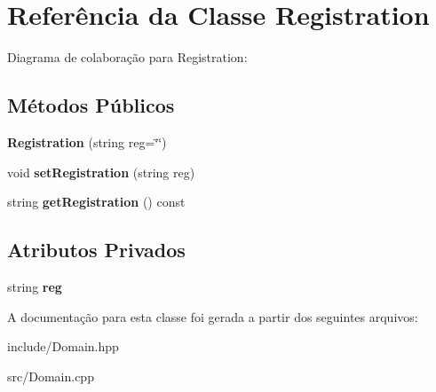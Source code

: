 \hypertarget{classRegistration}{}\section{Referência da Classe Registration}
\label{classRegistration}


Diagrama de colaboração para Registration\+:
\subsection*{Métodos Públicos}
\begin{DoxyCompactItemize}
\item 
{\bfseries Registration} (string reg=\char`\"{}\char`\"{})\hypertarget{classRegistration_adaf7a6aa993b11cde0b298c976ae5913}{}\label{classRegistration_adaf7a6aa993b11cde0b298c976ae5913}

\item 
void {\bfseries set\+Registration} (string reg)\hypertarget{classRegistration_af8cb446598b308d73c8fefd63f02a2aa}{}\label{classRegistration_af8cb446598b308d73c8fefd63f02a2aa}

\item 
string {\bfseries get\+Registration} () const \hypertarget{classRegistration_a7bfd5b95fa00e3465c625d36b45d9de5}{}\label{classRegistration_a7bfd5b95fa00e3465c625d36b45d9de5}

\end{DoxyCompactItemize}
\subsection*{Atributos Privados}
\begin{DoxyCompactItemize}
\item 
string {\bfseries reg}\hypertarget{classRegistration_afb78d65446087c2dd479cebb5b7cc89f}{}\label{classRegistration_afb78d65446087c2dd479cebb5b7cc89f}

\end{DoxyCompactItemize}


A documentação para esta classe foi gerada a partir dos seguintes arquivos\+:\begin{DoxyCompactItemize}
\item 
include/Domain.\+hpp\item 
src/Domain.\+cpp\end{DoxyCompactItemize}
